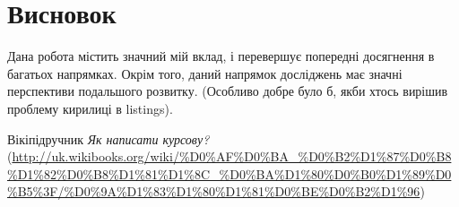 \documentclass[a4paper,14pt]{extreport}
\begin{document}
	
	\chapter{Висновок} 
	Дана робота містить значний мій вклад, і перевершує попередні досягнення в багатьох напрямках. Окрім того, даний напрямок досліджень має значні перспективи
	подальшого розвитку. (Особливо добре було б, якби хтось вирішив проблему кирилиці в listings).
	
	
	\newpage
	\begin{thebibliography}{9}
		
		 Вікіпідручник \emph{Як написати курсову?}
		(\url{http://uk.wikibooks.org/wiki/%D0%AF%D0%BA_%D0%B2%D1%87%D0%B8%D1%82%D0%B8%D1%81%D1%8C_%D0%BA%D1%80%D0%B0%D1%89%D0%B5%3F/%D0%9A%D1%83%D1%80%D1%81%D0%BE%D0%B2%D1%96})
			
		\end{thebibliography}
	
\end{document}
